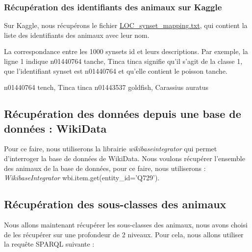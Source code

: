 \subsubsection{Récupération des identifiants des animaux sur Kaggle}

Sur Kaggle, nous récupérons le fichier \href{https://www.kaggle.com/competitions/imagenet-object-localization-challenge/data?select=LOC_synset_mapping.txt}{LOC\_synset\_mapping.txt}, qui contient la liste des identifiants des animaux avec leur nom.

La correspondance entre les 1000 synsets id et leurs descriptions. Par exemple, la ligne 1 indique n01440764 tanche, Tinca tinca signifie qu'il s'agit de la classe 1, que l'identifiant synset est n01440764 et qu'elle contient le poisson tanche.

\begin{customFrame}
n01440764 tench, Tinca tinca
n01443537 goldfish, Carassius auratus   
\end{customFrame}

\subsection{Récupération des données depuis une base de données : WikiData}

Pour ce faire, nous utiliserons la librairie \textit{wikibaseintegrator}\cite{wikibaseintegrator} qui permet d'interroger la base de données de WikiData.
Nous voulons récupérer l'ensemble des animaux de la base de données, pour ce faire, nous utiliserons : \textit{WikibaseIntegrator} wbi.item.get(entity\_id='Q729').


\subsection{Récupération des sous-classes des animaux}

Nous allons maintenant récupérer les sous-classes des animaux, nous avons choisi de les récupérer sur une profondeur de 2 niveaux. Pour cela, nous allons utiliser la requête SPARQL suivante :

\begin{paddingTab}
\end{paddingTab}

